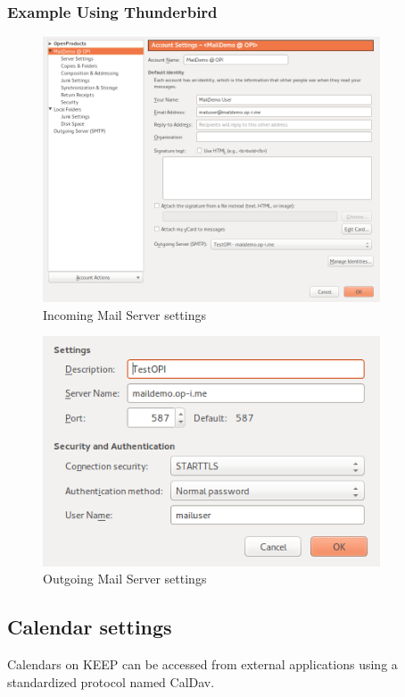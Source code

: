 \documentclass[12pt,a4paper,titlepage]{article}
\begin{document}
\subsubsection{Example Using Thunderbird}
\begin{figure}[h!]
\centering
\includegraphics[width=10cm]{./img/External-clients-thunderbird1.png}
\caption{Incoming Mail Server settings}
\end{figure}
\begin{figure}[h!]
\centering
\includegraphics[width=10cm]{./img/External-clients-thunderbird2.png}
\caption{Outgoing Mail Server settings}
\end{figure}

\newpage
\subsection{Calendar settings}
Calendars on KEEP can be accessed from external applications using a standardized protocol named CalDav.
\end{document}
